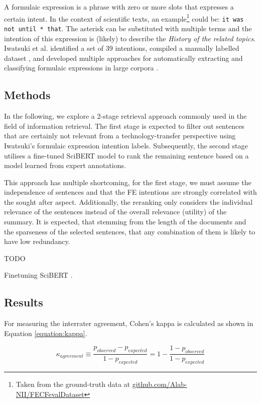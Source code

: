 A formulaic expression is a phrase with zero or more slots that expresses a certain intent. In the context of scientific texts, an example\footnote{Taken from the ground-truth data at \href{https://github.com/Alab-NII/FECFevalDataset/blob/master/human_evaluation/background.tsv}{github.com/Alab-NII/FECFevalDataset}} could be: \texttt{it was not until * that}. The asterisk can be substituted with multiple terms and the intention of this expression is (likely) to describe the \textit{History of the related topics}. Iwatsuki et al. identified a set of 39 intentions, compiled a manually labelled dataset \cite{iwatsuki2020evaluation}, and developed multiple approaches for automatically extracting and classifying formulaic expressions in large corpora \cite{iwatsuki2021communicative,iwatsuki2022extraction}.

\subsection{Methods}

In the following, we explore a 2-stage retrieval approach \cite{schutze2008introduction} commonly used in the field of information retrieval. The first stage is expected to filter out sentences that are certainly not relevant from a technology-transfer perspective using Iwatsuki's formulaic expression intention labels. Subsequently, the second stage utilises a fine-tuned SciBERT model to rank the remaining sentence based on a model learned from expert annotations.

This approach has multiple shortcoming, for the first stage, we must assume the independence of sentences and that the FE intentions are strongly correlated with the sought after aspect. Additionally, the reranking only considers the individual relevance of the sentences instead of the overall relevance (utility) of the summary. It is expected, that stemming from the length of the documents and the sparseness of the selected sentences, that any combination of them is likely to have low redundancy.

TODO

Finetuning SciBERT \cite{jurafsky2019speech}.

\subsection{Results}

For measuring the interrater agreement, Cohen's kappa \cite{cohen1960coefficient} is calculated as shown in Equation \ref{equation:kappa}.

\begin{equation} \label{equation:kappa}
\kappa_{agreement} \equiv \frac{p_{observed} - p_{expected}}{1 - p_{expected}} = 1 - \frac{1 - p_{observed}}{1 - p_{expected}}
\end{equation}
